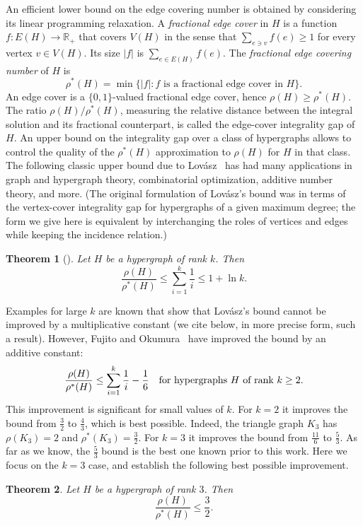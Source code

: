 \documentclass{article}
\newtheorem{theorem}{Theorem}[section]
\theoremstyle{definition}
\begin{document}
An efficient lower bound on the edge covering number is obtained by considering its linear programming relaxation. A \emph{fractional edge cover} in $H$ is a function $f: E(H) \to \mathbb{R}_+$ that covers $V(H)$ in the sense that $\sum_{e \ni v} f(e) \ge 1$ for every vertex $v \in V(H)$. Its size $|f|$ is $\sum_{e \in E(H)} f(e)$. The \emph{fractional edge covering number} of $H$ is \[ \rho^*(H) = \min \{|f|: f \textrm{ is a fractional edge cover in } H\}.\] An edge cover is a $\{0,1\}$-valued fractional edge cover, hence $\rho(H) \ge \rho^*(H)$. The ratio $\rho(H)/\rho^*(H)$, measuring the relative distance between the integral solution and its fractional counterpart, is called the edge-cover integrality gap of $H$. An upper bound on the integrality gap over a class of hypergraphs allows to control the quality of the $\rho^*(H)$ approximation to $\rho(H)$ for $H$ in that class. The following classic upper bound due to Lov\'asz~\cite{Lo1} has had many applications in graph and hypergraph theory, combinatorial optimization, additive number theory, and more. (The original formulation of Lov\'asz's bound was in terms of the vertex-cover integrality gap for hypergraphs of a given maximum degree; the form we give here is equivalent by interchanging the roles of vertices and edges while keeping the incidence relation.)
\begin{theorem}[{\cite{Lo1}}] \label{thm:Lo1}
Let $H$ be a hypergraph of rank $k$. Then \[ \frac{\rho(H)}{\rho^*(H)} \le \sum_{i=1}^k \frac{1}{i} \le 1 + \ln k.\]
\end{theorem}
Examples for large $k$ are known that show that Lov\'asz's bound cannot be improved by a multiplicative constant (we cite below, in more precise form, such a result). However, Fujito and Okumura~\cite{FO} have improved the bound by an additive constant: \[ \frac{\rho(H)}{\rho^*(H)} \le \sum_{i=1}^k \frac{1}{i} - \frac{1}{6} \textrm{ \,\, for hypergraphs } H \textrm{ of rank } k \ge 2.\]
This improvement is significant for small values of $k$. For $k=2$ it improves the bound from $\frac{3}{2}$ to $\frac{4}{3}$, which is best possible. Indeed, the triangle graph $K_3$ has $\rho(K_3)=2$ and $\rho^*(K_3)=\frac{3}{2}$. For $k=3$ it improves the bound from $\frac{11}{6}$ to $\frac{5}{3}$. As far as we know, the $\frac{5}{3}$ bound is the best one known prior to this work. Here we focus on the $k=3$ case, and establish the following best possible improvement.
\begin{theorem} \label{thm:3/2}
Let $H$ be a hypergraph of rank $3$. Then \[ \frac{\rho(H)}{\rho^*(H)} \le \frac{3}{2}.\]
\end{theorem}
\end{document}
